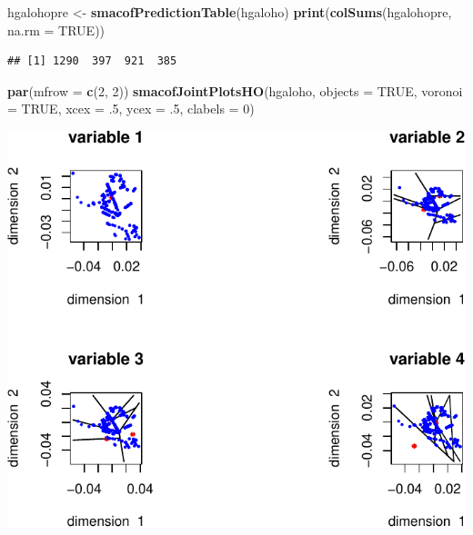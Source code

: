 \documentclass[
  12pt,
]{article}
\newenvironment{Shaded}{\begin{snugshade}}{\end{snugshade}}
\newcommand{\AttributeTok}[1]{\textcolor[rgb]{0.13,0.29,0.53}{#1}}
\newcommand{\ConstantTok}[1]{\textcolor[rgb]{0.56,0.35,0.01}{#1}}
\newcommand{\DecValTok}[1]{\textcolor[rgb]{0.00,0.00,0.81}{#1}}
\newcommand{\FunctionTok}[1]{\textcolor[rgb]{0.13,0.29,0.53}{\textbf{#1}}}
\newcommand{\NormalTok}[1]{#1}
\newcommand{\OtherTok}[1]{\textcolor[rgb]{0.56,0.35,0.01}{#1}}
\begin{document}
\begin{Shaded}
\begin{Highlighting}[]
\NormalTok{hgalohopre }\OtherTok{\textless{}{-}} \FunctionTok{smacofPredictionTable}\NormalTok{(hgaloho)}
\FunctionTok{print}\NormalTok{(}\FunctionTok{colSums}\NormalTok{(hgalohopre, }\AttributeTok{na.rm =} \ConstantTok{TRUE}\NormalTok{))}
\end{Highlighting}
\end{Shaded}

\begin{verbatim}
## [1] 1290  397  921  385
\end{verbatim}

\begin{Shaded}
\begin{Highlighting}[]
\FunctionTok{par}\NormalTok{(}\AttributeTok{mfrow =} \FunctionTok{c}\NormalTok{(}\DecValTok{2}\NormalTok{, }\DecValTok{2}\NormalTok{))}
\FunctionTok{smacofJointPlotsHO}\NormalTok{(hgaloho, }\AttributeTok{objects =} \ConstantTok{TRUE}\NormalTok{, }\AttributeTok{voronoi =} \ConstantTok{TRUE}\NormalTok{, }\AttributeTok{xcex =}\NormalTok{ .}\DecValTok{5}\NormalTok{, }\AttributeTok{ycex =}\NormalTok{ .}\DecValTok{5}\NormalTok{, }\AttributeTok{clabels =} \DecValTok{0}\NormalTok{)}
\end{Highlighting}
\end{Shaded}

\includegraphics{smacofHO_files/figure-latex/unnamed-chunk-9-1.pdf}
\end{document}

